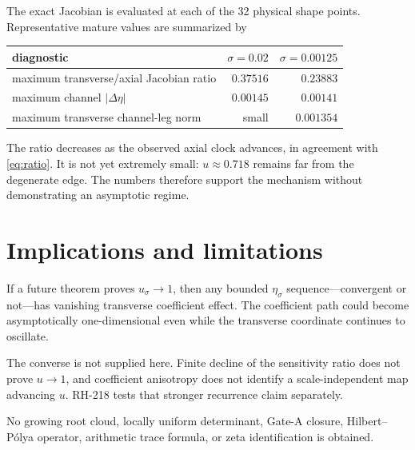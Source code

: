 \documentclass[12pt]{article}
\theoremstyle{remark}\newtheorem{remark}[theorem]{Remark}
\begin{document}
The exact Jacobian is evaluated at each of the 32 physical shape points.
Representative mature values are summarized by
\begin{center}
\begin{tabular}{lrr}
\toprule
diagnostic & $\sigma=0.02$ & $\sigma=0.00125$\\
\midrule
maximum transverse/axial Jacobian ratio & $0.37516$ & $0.23883$\\
maximum channel $|\Delta\eta|$ & $0.00145$ & $0.00141$\\
maximum transverse channel-leg norm & small & $0.001354$\\
\bottomrule
\end{tabular}
\end{center}

The ratio decreases as the observed axial clock advances, in agreement with
\eqref{eq:ratio}.  It is not yet extremely small: $u\approx0.718$ remains far
from the degenerate edge.  The numbers therefore support the mechanism
without demonstrating an asymptotic regime.

\section{Implications and limitations}

If a future theorem proves $u_\sigma\to1$, then any bounded $\eta_\sigma$
sequence---convergent or not---has vanishing transverse coefficient effect.
The coefficient path could become asymptotically one-dimensional even while
the transverse coordinate continues to oscillate.

The converse is not supplied here.  Finite decline of the sensitivity ratio
does not prove $u\to1$, and coefficient anisotropy does not identify a
scale-independent map advancing $u$.  RH-218 tests that stronger recurrence
claim separately.

No growing root cloud, locally uniform determinant, Gate-A closure,
Hilbert--P\'olya operator, arithmetic trace formula, or zeta identification
is obtained.


\end{document}
